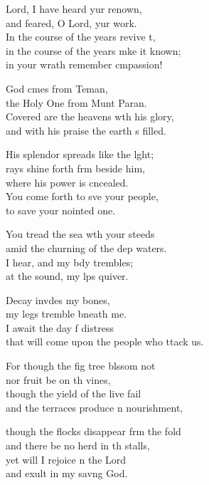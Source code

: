 \settowidth{\versewidth}{that will come upon the people who attack us.}
\begin{psalmverse}%
  \begin{patverse}
 Lord, I have heard yur renown,\Med\\
and feared, O Lord, yur work.\\
In the course of the years revive \pointup{\i}t,\Flex\\
in the course of the years mke it known;\Med\\
in your wrath remember cmpassion!

God cmes from Teman,\Med\\
the Holy One from Munt Paran.\\
Covered are the heavens w\pointup{\i}th his glory,\Med\\
and with his praise the earth \pointup{\i}s filled.

His splendor spreads like the l\pointup{\i}ght;\Flex\\
rays shine forth frm beside him,\Med\\
where his power is cncealed.\\
You come forth to sve your people,\Med\\
to save your nointed one.

You tread the sea w\pointup{\i}th your steeds\Med\\
amid the churning of the dep waters.\\
I hear, and my bdy trembles;\Med\\
at the sound, my l\pointup{\i}ps quiver.

Decay invdes my bones,\Med\\
my legs tremble bneath me.\\
I await the day f distress\Med\\
that will come upon the people who ttack us.

For though the fig tree blssom not\Med\\
nor fruit be on th vines,\\
though the yield of the live fail\Med\\
and the terraces produce n nourishment,

though the flocks disappear frm the fold\Med\\
and there be no herd in th stalls,\\
yet will I rejoice \pointup{\i}n the Lord\Med\\
and exult in my sav\pointup{\i}ng God.


\end{patverse}
\end{psalmverse}

